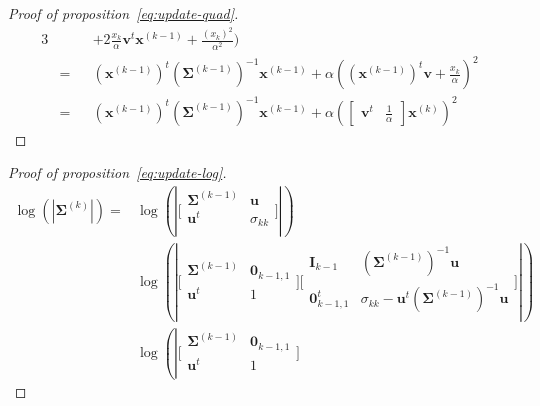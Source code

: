 \documentclass[journal]{IEEEtran}
\begin{document}
\begin{proof}[Proof of proposition~\ref{eq:update-quad}]
\begin{alignat*}{3}
     & &&+ 2 \frac{x_k}{\alpha} \mathbf{v}^t \mathbf{x}^{(k-1)} + \frac{(x_k)^2}{\alpha^2}) \\
     &= &&(\mathbf{x}^{(k-1)})^t (\boldsymbol{\Sigma}^{(k-1)})^{-1} \mathbf{x}^{(k-1)} + \alpha ( (\mathbf{x}^{(k-1)})^t \mathbf{v} + \frac{x_k}{\alpha} )^2 \\
     &= &&(\mathbf{x}^{(k-1)})^t (\boldsymbol{\Sigma}^{(k-1)})^{-1} \mathbf{x}^{(k-1)} + \alpha ( \left[\begin{array}{cc} \mathbf{v}^t & \frac{1}{\alpha} \end{array}\right] \mathbf{x}^{(k)} )^2
    \end{alignat*}
\end{proof}

\begin{proof}[Proof of proposition~\ref{eq:update-log}]
    \begin{align*}
        \log \left(|\boldsymbol{\Sigma}^{(k)}|\right) =
        &\log \left(\left|
            \bigg[\begin{array}{cc}
                \boldsymbol{\Sigma}^{(k-1)} & \mathbf{u}      \\
                \mathbf{u}^t          & \sigma_{kk} \\
            \end{array}\bigg]
        \right|\right) \\
        &\log \left(\left|
            \bigg[\begin{array}{cc}
                \boldsymbol{\Sigma}^{(k-1)} & \mathbf{0}_{k-1,1}     \\
                \mathbf{u}^t          & 1 \\
            \end{array}\bigg]
            \bigg[\begin{array}{cc}
                \mathbf{I}_{k-1} & (\boldsymbol{\Sigma}^{(k-1)})^{-1} \mathbf{u}      \\
                \mathbf{0}_{k-1,1}^t          & \sigma_{kk} - \mathbf{u}^t(\boldsymbol{\Sigma}^{(k-1)})^{-1} \mathbf{u}\\
            \end{array}\bigg]
        \right|\right) \\
        &\log \left(\left|
            \bigg[\begin{array}{cc}
                \boldsymbol{\Sigma}^{(k-1)} & \mathbf{0}_{k-1,1}     \\
                \mathbf{u}^t          & 1 \\
            \end{array}\bigg]

\end{align*}
\end{proof}
\end{document}
